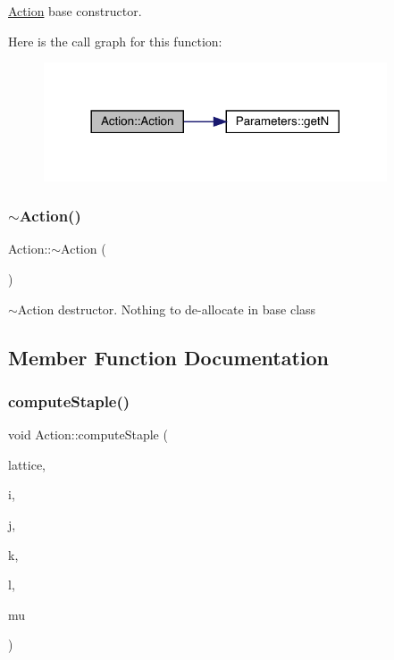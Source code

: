 \mbox{\hyperlink{class_action}{Action}} base constructor. 

Here is the call graph for this function\+:
\nopagebreak
\begin{figure}[H]
\begin{center}
\leavevmode
\includegraphics[width=288pt]{class_action_a4f457ccfc8336b565cadca56b36e0271_cgraph}
\end{center}
\end{figure}
\mbox{\label{class_action_acdb06775d157339256a8ecd55749226c}} 
\subsubsection{\texorpdfstring{$\sim$Action()}{~Action()}}
{\footnotesize\ttfamily Action\+::$\sim$\+Action (\begin{DoxyParamCaption}{ }\end{DoxyParamCaption})\hspace{0.3cm}{\ttfamily [virtual]}}



$\sim$\+Action destructor. Nothing to de-\/allocate in base class 



\subsection{Member Function Documentation}
\mbox{\label{class_action_a2d5a64b47a8913955e5911ca072ff80d}} 
\subsubsection{\texorpdfstring{computeStaple()}{computeStaple()}}
{\footnotesize\ttfamily void Action\+::compute\+Staple (\begin{DoxyParamCaption}\item[{\mbox{\hyperlink{class_lattice}{Lattice}}$<$ \mbox{\hyperlink{class_s_u3}{S\+U3}} $>$ $\ast$}]{lattice,  }\item[{unsigned int}]{i,  }\item[{unsigned int}]{j,  }\item[{unsigned int}]{k,  }\item[{unsigned int}]{l,  }\item[{int}]{mu }\end{DoxyParamCaption})\hspace{0.3cm}{\ttfamily [virtual]}}




